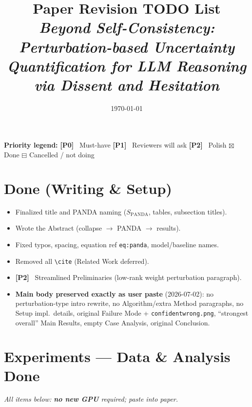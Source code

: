 \documentclass[11pt]{article}
\title{\textbf{Paper Revision TODO List}\\[2pt]
\large\itshape Beyond Self-Consistency: Perturbation-based Uncertainty Quantification for LLM Reasoning via Dissent and Hesitation}
\author{}
\date{\today}
\newcommand{\done}{\item[\textcolor{donecolor}{$\boxtimes$}]}
\newcommand{\tagp}[2]{\textbf{\textcolor{#1}{[#2]}}\ }
\begin{document}
\maketitle
\vspace{-2.5em}

\noindent\textbf{Priority legend:}\quad
\tagp{p0}{P0} Must-have \quad
\tagp{p1}{P1} Reviewers will ask \quad
\tagp{p2}{P2} Polish \quad
\textcolor{donecolor}{$\boxtimes$} Done \quad
\textcolor{skipcolor}{$\boxminus$} Cancelled / not doing

\bigskip

\section{Done (Writing \& Setup)}
\begin{itemize}
  \done Finalized title and PANDA naming ($S_{\mathrm{PANDA}}$, tables, subsection titles).
  \done Wrote the Abstract (collapse $\rightarrow$ PANDA $\rightarrow$ results).
  \done Fixed typos, spacing, equation ref \texttt{eq:panda}, model/baseline names.
  \done Removed all \texttt{\textbackslash cite} (Related Work deferred).
  \done \tagp{p2}{P2} Streamlined Preliminaries (low-rank weight perturbation paragraph).
  \done \textbf{Main body preserved exactly as user paste} (2026-07-02): no perturbation-type intro rewrite, no Algorithm/extra Method paragraphs, no Setup impl.\ details, original Failure Mode + \texttt{confidentwrong.png}, ``strongest overall'' Main Results, empty Case Analysis, original Conclusion.
\end{itemize}

\section{Experiments --- Data \& Analysis Done}
\textit{All items below: \textbf{no new GPU} required; paste into paper.}
\end{document}
